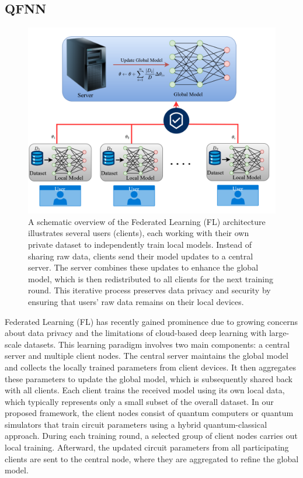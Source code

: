 \documentclass[10pt]{article}
\begin{document}
\subsection{QFNN}
\begin{figure}[h!]
	\centering
	\includegraphics[height = 0.30\textheight]{img/FL_model.png}
	\caption{A schematic overview of the Federated Learning (FL) architecture illustrates several users (clients), each working with their own private dataset to independently train local models. Instead of sharing raw data, clients send their model updates to a central server. The server combines these updates to enhance the global model, which is then redistributed to all clients for the next training round. This iterative process preserves data privacy and security by ensuring that users' raw data remains on their local devices.}
\end{figure}
\noindent Federated Learning (FL) has recently gained prominence due to growing concerns about data privacy and the limitations of cloud-based deep learning with large-scale datasets. This learning paradigm involves two main components: a central server and multiple client nodes. The central server maintains the global model and collects the locally trained parameters from client devices. It then aggregates these parameters to update the global model, which is subsequently shared back with all clients. Each client trains the received model using its own local data, which typically represents only a small subset of the overall dataset.
In our proposed framework, the client nodes consist of quantum computers or quantum simulators that train circuit parameters using a hybrid quantum-classical approach. During each training round, a selected group of client nodes carries out local training. Afterward, the updated circuit parameters from all participating clients are sent to the central node, where they are aggregated to refine the global model.
\end{document}
